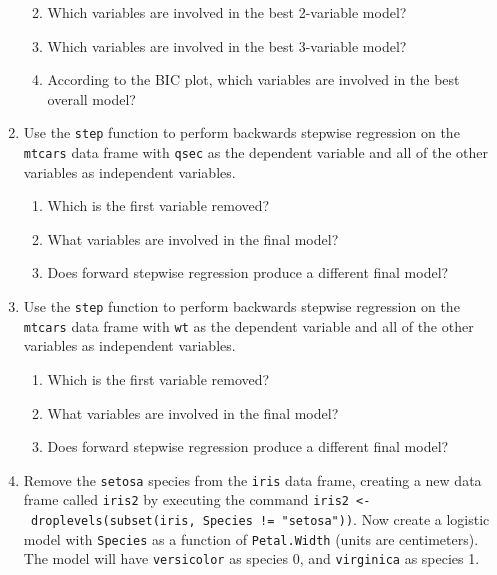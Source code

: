 \documentclass[
]{book}
\providecommand{\tightlist}{%
  \setlength{\itemsep}{0pt}\setlength{\parskip}{0pt}}
\theoremstyle{definition}
\theoremstyle{definition}
\theoremstyle{definition}
\theoremstyle{definition}
\theoremstyle{remark}
\begin{document}
\begin{enumerate}
  \begin{enumerate}
  \def\labelenumii{\alph{enumii}.}
  \tightlist
  \item
    Which variables are involved in the best 2-variable model?
  \item
    Which variables are involved in the best 3-variable model?
  \item
    According to the BIC plot, which variables are involved in the best overall model?
  \end{enumerate}
\item
  Use the \texttt{step} function to perform backwards stepwise regression on the \texttt{mtcars} data frame with \texttt{qsec} as the dependent variable and all of the other variables as independent variables.

  \begin{enumerate}
  \def\labelenumii{\alph{enumii}.}
  \tightlist
  \item
    Which is the first variable removed?
  \item
    What variables are involved in the final model?
  \item
    Does forward stepwise regression produce a different final model?
  \end{enumerate}
\item
  Use the \texttt{step} function to perform backwards stepwise regression on the \texttt{mtcars} data frame with \texttt{wt} as the dependent variable and all of the other variables as independent variables.

  \begin{enumerate}
  \def\labelenumii{\alph{enumii}.}
  \tightlist
  \item
    Which is the first variable removed?
  \item
    What variables are involved in the final model?
  \item
    Does forward stepwise regression produce a different final model?
  \end{enumerate}
\item
  Remove the \texttt{setosa} species from the \texttt{iris} data frame, creating a new data frame called \texttt{iris2} by executing the command \texttt{iris2\ \textless{}-\ droplevels(subset(iris,\ Species\ !=\ "setosa"))}. Now create a logistic model with \texttt{Species} as a function of \texttt{Petal.Width} (units are centimeters). The model will have \texttt{versicolor} as species 0, and \texttt{virginica} as species 1.


\end{enumerate}
\end{document}
